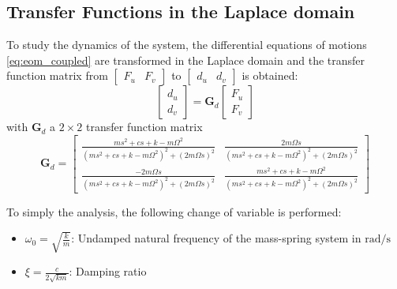 \documentclass{ISMA_USD2020}
\begin{document}
\subsection{Transfer Functions in the Laplace domain}
\label{sec:org16be790}
To study the dynamics of the system, the differential equations of motions \eqref{eq:eom_coupled} are transformed in the Laplace domain and the transfer function matrix from \(\begin{bmatrix}F_u & F_v\end{bmatrix}\) to \(\begin{bmatrix}d_u & d_v\end{bmatrix}\) is obtained:
\begin{equation}
\label{eq:Gd_mimo_tf}
  \begin{bmatrix} d_u \\ d_v \end{bmatrix} = \bm{G}_d \begin{bmatrix} F_u \\ F_v \end{bmatrix}
\end{equation}
with \(\bm{G}_d\) a \(2 \times 2\) transfer function matrix
\begin{equation}
\label{eq:Gd_m_k_c}
  \bm{G}_{d} =
  \begin{bmatrix}
    \frac{ms^2 + cs + k - m \Omega^2}{\left( m s^2 + cs + k - m \Omega^2 \right)^2 + \left( 2 m \Omega s \right)^2} & \frac{2 m \Omega s}{\left( m s^2 + cs + k - m \Omega^2 \right)^2 + \left( 2 m \Omega s \right)^2} \\
    \frac{-2 m \Omega s}{\left( m s^2 + cs + k - m \Omega^2 \right)^2 + \left( 2 m \Omega s \right)^2} & \frac{ms^2 + cs + k - m \Omega^2}{\left( m s^2 + cs + k - m \Omega^2 \right)^2 + \left( 2 m \Omega s \right)^2}
  \end{bmatrix}
\end{equation}

To simply the analysis, the following change of variable is performed:
\begin{itemize}
\item \(\omega_0 = \sqrt{\frac{k}{m}}\): Undamped natural frequency of the mass-spring system in \(\si{\radian/\s}\)
\item \(\xi = \frac{c}{2 \sqrt{k m}}\): Damping ratio
\end{itemize}
\end{document}
